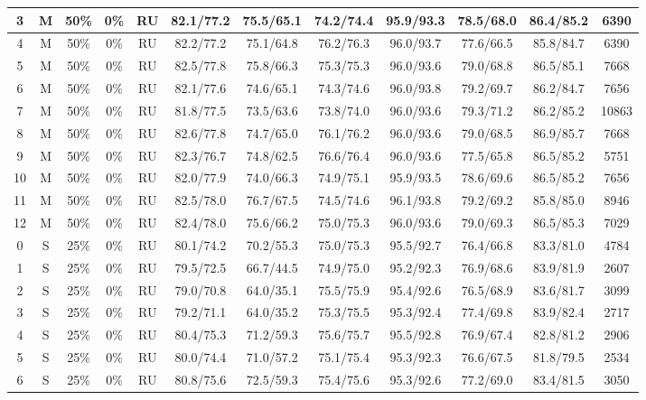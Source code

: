 \begin{table*}
{\begin{tabular}{|c|c|c|c|c||c|c|c|c|c|c||c|}
3 & M & 50\% & 0\% & RU & 82.1/77.2 & 75.5/65.1 & 74.2/74.4 & 95.9/93.3 & 78.5/68.0 & 86.4/85.2 & 6390 \\ \hline
4 & M & 50\% & 0\% & RU & 82.2/77.2 & 75.1/64.8 & 76.2/76.3 & 96.0/93.7 & 77.6/66.5 & 85.8/84.7 & 6390 \\ \hline
5 & M & 50\% & 0\% & RU & 82.5/77.8 & 75.8/66.3 & 75.3/75.3 & 96.0/93.6 & 79.0/68.8 & 86.5/85.1 & 7668 \\ \hline
6 & M & 50\% & 0\% & RU & 82.1/77.6 & 74.6/65.1 & 74.3/74.6 & 96.0/93.8 & 79.2/69.7 & 86.2/84.7 & 7656 \\ \hline
7 & M & 50\% & 0\% & RU & 81.8/77.5 & 73.5/63.6 & 73.8/74.0 & 96.0/93.6 & 79.3/71.2 & 86.2/85.2 & 10863 \\ \hline
8 & M & 50\% & 0\% & RU & 82.6/77.8 & 74.7/65.0 & 76.1/76.2 & 96.0/93.6 & 79.0/68.5 & 86.9/85.7 & 7668 \\ \hline
9 & M & 50\% & 0\% & RU & 82.3/76.7 & 74.8/62.5 & 76.6/76.4 & 96.0/93.6 & 77.5/65.8 & 86.5/85.2 & 5751 \\ \hline
10 & M & 50\% & 0\% & RU & 82.0/77.9 & 74.0/66.3 & 74.9/75.1 & 95.9/93.5 & 78.6/69.6 & 86.5/85.2 & 7656 \\ \hline
11 & M & 50\% & 0\% & RU & 82.5/78.0 & 76.7/67.5 & 74.5/74.6 & 96.1/93.8 & 79.2/69.2 & 85.8/85.0 & 8946 \\ \hline
12 & M & 50\% & 0\% & RU & 82.4/78.0 & 75.6/66.2 & 75.0/75.3 & 96.0/93.6 & 79.0/69.3 & 86.5/85.3 & 7029 \\ \hline
0 & S & 25\% & 0\% & RU & 80.1/74.2 & 70.2/55.3 & 75.0/75.3 & 95.5/92.7 & 76.4/66.8 & 83.3/81.0 & 4784 \\ \hline
1 & S & 25\% & 0\% & RU & 79.5/72.5 & 66.7/44.5 & 74.9/75.0 & 95.2/92.3 & 76.9/68.6 & 83.9/81.9 & 2607 \\ \hline
2 & S & 25\% & 0\% & RU & 79.0/70.8 & 64.0/35.1 & 75.5/75.9 & 95.4/92.6 & 76.5/68.9 & 83.6/81.7 & 3099 \\ \hline
3 & S & 25\% & 0\% & RU & 79.2/71.1 & 64.0/35.2 & 75.3/75.5 & 95.3/92.4 & 77.4/69.8 & 83.9/82.4 & 2717 \\ \hline
4 & S & 25\% & 0\% & RU & 80.4/75.3 & 71.2/59.3 & 75.6/75.7 & 95.5/92.8 & 76.9/67.4 & 82.8/81.2 & 2906 \\ \hline
5 & S & 25\% & 0\% & RU & 80.0/74.4 & 71.0/57.2 & 75.1/75.4 & 95.3/92.3 & 76.6/67.5 & 81.8/79.5 & 2534 \\ \hline
6 & S & 25\% & 0\% & RU & 80.8/75.6 & 72.5/59.3 & 75.4/75.6 & 95.3/92.6 & 77.2/69.0 & 83.4/81.5 & 3050 \\ \hline

\end{tabular}}
\end{table*}
